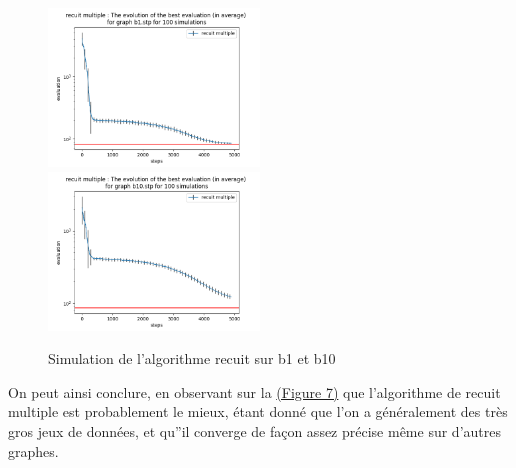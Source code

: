 \documentclass[11pt,french]{report}
\begin{document}
        \begin{figure}
          \label{Figure7}
          \includegraphics[width=0.5\textwidth]{best_b1_evaluation_recuit multiple.png}
          \includegraphics[width=0.5\textwidth]{best_b10_evaluation_recuit multiple.png}
          \caption{Simulation de l'algorithme recuit sur b1 et b10}
        \end{figure}

        On peut ainsi conclure, en observant sur la \hyperref[Figure7]{(Figure 7)} que l'algorithme de recuit multiple est probablement le mieux, étant donné que l'on a généralement des très gros jeux de données, et qu''il converge de façon assez précise même sur d'autres graphes.
        
\end{document}
